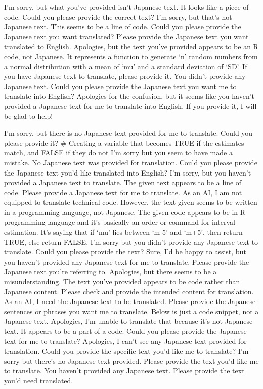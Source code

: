 \documentclass[
  a4paper,
]{book}
\begin{document}
I'm sorry, but what you've provided isn't Japanese text. It looks like a
piece of code. Could you please provide the correct text? I'm sorry, but
that's not Japanese text. This seems to be a line of code. Could you
please provide the Japanese text you want translated? Please provide the
Japanese text you want translated to English. Apologies, but the text
you've provided appears to be an R code, not Japanese. It represents a
function to generate `n' random numbers from a normal distribution with
a mean of `mu' and a standard deviation of `SD'. If you have Japanese
text to translate, please provide it. You didn't provide any Japanese
text. Could you please provide the Japanese text you want me to
translate into English? Apologies for the confusion, but it seems like
you haven't provided a Japanese text for me to translate into English.
If you provide it, I will be glad to help!

I'm sorry, but there is no Japanese text provided for me to translate.
Could you please provide it? \# Creating a variable that becomes TRUE if
the estimates match, and FALSE if they do not I'm sorry but you seem to
have made a mistake. No Japanese text was provided for translation.
Could you please provide the Japanese text you'd like translated into
English? I'm sorry, but you haven't provided a Japanese text to
translate. The given text appears to be a line of code. Please provide a
Japanese text for me to translate. As an AI, I am not equipped to
translate technical code. However, the text given seems to be written in
a programming language, not Japanese. The given code appears to be in R
programming language and it's basically an order or command for interval
estimation. It's saying that if `mu' lies between `m-5' and `m+5', then
return TRUE, else return FALSE. I'm sorry but you didn't provide any
Japanese text to translate. Could you please provide the text? Sure, I'd
be happy to assist, but you haven't provided any Japanese text for me to
translate. Please provide the Japanese text you're referring to.
Apologies, but there seems to be a misunderstanding. The text you've
provided appears to be code rather than Japanese content. Please check
and provide the intended content for translation. As an AI, I need the
Japanese text to be translated. Please provide the Japanese sentences or
phrases you want me to translate. Below is just a code snippet, not a
Japanese text. Apologies, I'm unable to translate that because it's not
Japanese text. It appears to be a part of a code. Could you please
provide the Japanese text for me to translate? Apologies, I can't see
any Japanese text provided for translation. Could you provide the
specific text you'd like me to translate? I'm sorry but there's no
Japanese text provided. Please provide the text you'd like me to
translate. You haven't provided any Japanese text. Please provide the
text you'd need translated.
\end{document}
